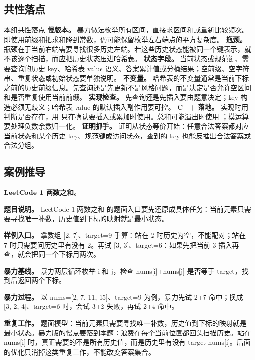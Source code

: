 \subsection{共性落点}

\begin{principlebox}{本组共性落点}
\textbf{慢版本。} 暴力做法枚举所有区间，直接求区间和或重新比较频次。即使用前缀和把求和降到常数，仍可能保留枚举左右端点的平方复杂度。
\textbf{瓶颈。} 瓶颈在于当前右端需要寻找很多历史左端。若这些历史状态能被同一个键表示，就不该逐个扫描，而应把历史状态压进哈希表。
\textbf{状态字段。} 当前状态或规范键、需要查询的历史 key、哈希表 value 语义、答案累计值或分桶结果；空前缀、空字符串、重复状态或初始状态要单独说明。
\textbf{不变量。} 哈希表的不变量通常是当前下标之前的历史前缀信息。先查询还是先更新不是风格问题，而是决定是否允许空区间和是否重复使用当前前缀。
\textbf{实现检查。} 先查询还是先插入要由题意决定；key 构造必须无歧义；哈希表 value 的默认插入副作用要可控。
\textbf{C++ 落地。} 实现时用  判断是否存在，用  只在确认要插入或累加时使用。总和可能溢出时使用 ；模运算要处理负数余数归一化。
\textbf{证明抓手。} 证明从状态等价开始：任意合法答案都对应当前状态和某个历史 key、规范键或访问状态，查到的 key 也能反推出合法答案或合法分组。
\end{principlebox}

\subsection{案例推导}

\noindent\textbf{LeetCode 1 两数之和。}

\textbf{题目说明。} LeetCode 1 两数之和 的题面入口要先还原成具体任务：当前元素只需要寻找唯一补数，历史值到下标的映射就是最小状态。

\textbf{样例入口。} 拿数组 [2, 7]、target=9 手算：站在 2 时历史为空，不能配对；站在 7 时只需要问历史里有没有 2。再试 [3, 3]、target=6：如果先把当前 3 插入再查，就会把同一个下标用两次。

\textbf{暴力基线。} 暴力两层循环枚举 i 和 j，检查 nums[i]+nums[j] 是否等于 target，找到后返回两个下标。

\textbf{暴力过程。} 以 nums=[2, 7, 11, 15]、target=9 为例，暴力先试 2+7 命中；换成 [3, 2, 4]、target=6 时，会试 3+2 失败，再试 2+4 命中。

\textbf{重复工作。} 题面模型：当前元素只需要寻找唯一补数，历史值到下标的映射就是最小状态。暴力版的慢点要落到本题：浪费在每个当前位置都回头扫描历史。站在 nums[i] 时，真正需要的不是所有历史值，而是历史里有没有 target-nums[i]。后面的优化只消掉这类重复工作，不能改变答案集合。

